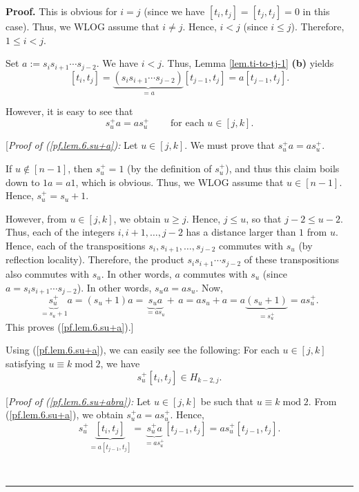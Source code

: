 \documentclass[numbers=enddot,12pt,final,onecolumn,notitlepage]{scrartcl}%
\theoremstyle{definition}
\newenvironment{proof}[1][Proof]{\noindent\textbf{#1.} }{\ \rule{0.5em}{0.5em}}
\begin{document}
\begin{proof}
This is obvious for $i=j$ (since we have $\left[  t_{i},t_{j}\right]  =\left[
t_{j},t_{j}\right]  =0$ in this case). Thus, we WLOG assume that $i\neq j$.
Hence, $i<j$ (since $i\leq j$). Therefore, $1\leq i<j$.

Set $a:=s_{i}s_{i+1}\cdots s_{j-2}$. We have $i<j$. Thus, Lemma
\ref{lem.ti-to-tj-1} \textbf{(b)} yields
\[
\left[  t_{i},t_{j}\right]  =\underbrace{\left(  s_{i}s_{i+1}\cdots
s_{j-2}\right)  }_{=a}\left[  t_{j-1},t_{j}\right]  =a\left[  t_{j-1}%
,t_{j}\right]  .
\]


However, it is easy to see that%
\begin{equation}
s_{u}^{+}a=as_{u}^{+}\ \ \ \ \ \ \ \ \ \ \text{for each }u\in\left[
j,k\right]  . \label{pf.lem.6.su+a}%
\end{equation}


[\textit{Proof of (\ref{pf.lem.6.su+a}):} Let $u\in\left[  j,k\right]  $. We
must prove that $s_{u}^{+}a=as_{u}^{+}$.

If $u\notin\left[  n-1\right]  $, then $s_{u}^{+}=1$ (by the definition of
$s_{u}^{+}$), and thus this claim boils down to $1a=a1$, which is obvious.
Thus, we WLOG assume that $u\in\left[  n-1\right]  $. Hence, $s_{u}^{+}%
=s_{u}+1$.

However, from $u\in\left[  j,k\right]  $, we obtain $u\geq j$. Hence, $j\leq
u$, so that $j-2\leq u-2$. Thus, each of the integers $i,i+1,\ldots,j-2$ has a
distance larger than $1$ from $u$. Hence, each of the transpositions
$s_{i},s_{i+1},\ldots,s_{j-2}$ commutes with $s_{u}$ (by reflection locality).
Therefore, the product $s_{i}s_{i+1}\cdots s_{j-2}$ of these transpositions
also commutes with $s_{u}$. In other words, $a$ commutes with $s_{u}$ (since
$a=s_{i}s_{i+1}\cdots s_{j-2}$). In other words, $s_{u}a=as_{u}$. Now,%
\[
\underbrace{s_{u}^{+}}_{=s_{u}+1}a=\left(  s_{u}+1\right)  a=\underbrace{s_{u}%
a}_{=as_{u}}+\,a=as_{u}+a=a\underbrace{\left(  s_{u}+1\right)  }_{=s_{u}^{+}%
}=as_{u}^{+}.
\]
This proves (\ref{pf.lem.6.su+a}).] \medskip

Using (\ref{pf.lem.6.su+a}), we can easily see the following: For each
$u\in\left[  j,k\right]  $ satisfying $u\equiv k\operatorname{mod}2$, we have%
\begin{equation}
s_{u}^{+}\left[  t_{i},t_{j}\right]  \in H_{k-2,j}. \label{pf.lem.6.su+abra}%
\end{equation}


[\textit{Proof of (\ref{pf.lem.6.su+abra}):} Let $u\in\left[  j,k\right]  $ be
such that $u\equiv k\operatorname{mod}2$. From (\ref{pf.lem.6.su+a}), we
obtain $s_{u}^{+}a=as_{u}^{+}$. Hence,%
\begin{equation}
s_{u}^{+}\underbrace{\left[  t_{i},t_{j}\right]  }_{=a\left[  t_{j-1}%
,t_{j}\right]  }=\underbrace{s_{u}^{+}a}_{=as_{u}^{+}}\left[  t_{j-1}%
,t_{j}\right]  =as_{u}^{+}\left[  t_{j-1},t_{j}\right]  .
\label{pf.lem.6.su+abra.pf.1}%
\end{equation}



\end{proof}
\end{document}
